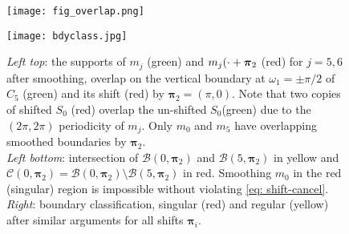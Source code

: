 
\begin{figure}[!t]
\centering
\hspace*{-5mm}
\begin{minipage}{.6\textwidth}
\texttt{[image: fig\_overlap.png]}\hspace*{-2mm}
\end{minipage}
\begin{minipage}{.3\textwidth}
\texttt{[image: bdyclass.jpg]}
\end{minipage}
\caption[caption]{
{\it Left top}: the supports of $m_j$ (green) and $m_j(\cdot+\boldsymbol{\pi}_2$ (red) for $j = 5,6$ after smoothing, overlap on the vertical boundary at $\omega_1 =  \pm \pi/2$ of $C_5$ (green) and its shift (red) by $\boldsymbol{\pi}_2 = (\pi,0)$. Note that two copies of shifted $S_0$ (red) overlap the un-shifted $S_0$(green) due to the $(2\pi,2\pi)$ periodicity of $m_j$. Only $m_0$ and $m_5$ have overlapping smoothed boundaries by $\boldsymbol{\pi}_2$. 
\\\hspace{\textwidth}
{\it Left bottom}: intersection of $\mathcal{B}(0,\boldsymbol{\pi}_2)$ and $\mathcal{B}(5,\boldsymbol{\pi}_2)$ in yellow and $\mathcal{C}(0,\boldsymbol{\pi}_2) = \mathcal{B}(0,\boldsymbol{\pi}_2)\setminus\mathcal{B}(5,\boldsymbol{\pi}_2)$ in red. Smoothing $m_0$ in the red (singular) region is impossible without violating \eqref{eq: shift-cancel}. %
\\\hspace{\textwidth}
{\it Right}: boundary classification, singular (red) and regular (yellow) after similar arguments for all shifts $\boldsymbol{\pi}_i$.}
\label{fig: boundary}
\end{figure}


